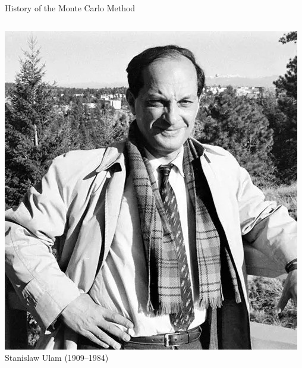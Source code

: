 \documentclass[8pt]{beamer}
\begin{document}
\begin{frame}{History of the Monte Carlo Method}
\begin{columns}
    \begin{column}{0.35\textwidth}
        \begin{center}
            \includegraphics[width=\textwidth]{ulam.jpg} %
            \\[0.5em]
            \footnotesize Stanislaw Ulam (1909–1984)
        \end{center}
    \end{column}
\end{columns}
\end{frame}
\end{document}
